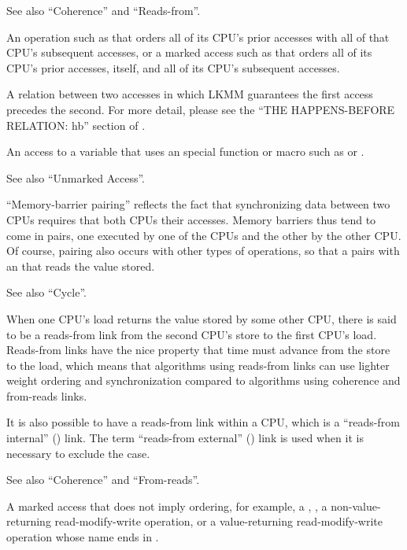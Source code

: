 \begin{description}[style=nextline]
	See also ``Coherence'' and ``Reads-from''.

  \item[Fully Ordered:]
	An operation such as  that orders all of
	its CPU's prior accesses with all of that CPU's subsequent
	accesses, or a marked access such as 
	that orders all of its CPU's prior accesses, itself, and
	all of its CPU's subsequent accesses.

  \item[Happens-Before (\tco{hb}):]
	A relation between two accesses in which LKMM
	guarantees the first access precedes the second.
	For more detail, please see the ``THE HAPPENS-BEFORE RELATION: hb''
	section of .

  \item[Marked Access:]
	An access to a variable that uses an special function or
	macro such as  or .

	See also ``Unmarked Access''.

  \item[Pairing:]
	``Memory-barrier pairing'' reflects the fact that synchronizing
	data between two CPUs requires that both CPUs their accesses.
	Memory barriers thus tend to come in pairs, one executed by
	one of the CPUs and the other by the other CPU.
	Of course, pairing also occurs with other types of operations,
	so that a  pairs with an
	 that reads the value stored.

	See also ``Cycle''.

  \item[Reads-From (\tco{rf}):]
	When one CPU's load returns the value stored by some other
	CPU, there is said to be a reads-from link from the second
	CPU's store to the first CPU's load.
	Reads-from links have the nice property that time must advance
	from the store to the load, which means that algorithms using
	reads-from links can use lighter weight ordering and
	synchronization compared to algorithms using coherence and
	from-reads links.

	It is also possible to have a reads-from link within a CPU, which
	is a ``reads-from internal'' () link.
	The term ``reads-from external'' () link is used when it
	is necessary to exclude	the  case.

	See also ``Coherence'' and ``From-reads''.

  \item[Relaxed:]
	A marked access that does not imply ordering, for example, a
	, , a non-value-returning
	read-modify-write operation, or a value-returning
	read-modify-write operation whose name ends in .


\end{description}
